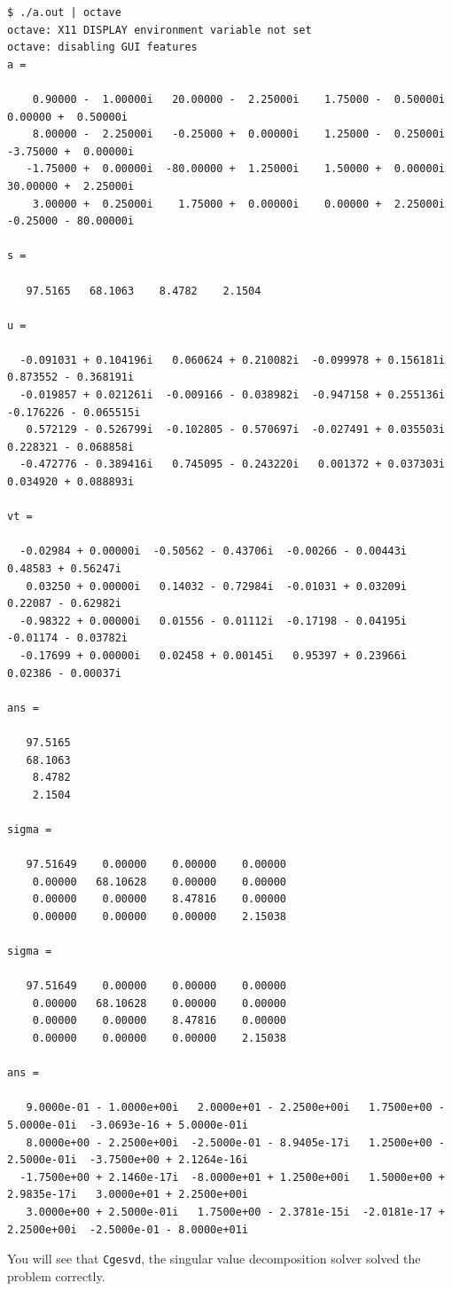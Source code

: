 \documentclass[12pt]{article}
\begin{document}
{\footnotesize
\begin{verbatim}
$ ./a.out | octave
octave: X11 DISPLAY environment variable not set
octave: disabling GUI features
a =

    0.90000 -  1.00000i   20.00000 -  2.25000i    1.75000 -  0.50000i    0.00000 +  0.50000i
    8.00000 -  2.25000i   -0.25000 +  0.00000i    1.25000 -  0.25000i   -3.75000 +  0.00000i
   -1.75000 +  0.00000i  -80.00000 +  1.25000i    1.50000 +  0.00000i   30.00000 +  2.25000i
    3.00000 +  0.25000i    1.75000 +  0.00000i    0.00000 +  2.25000i   -0.25000 - 80.00000i

s =

   97.5165   68.1063    8.4782    2.1504

u =

  -0.091031 + 0.104196i   0.060624 + 0.210082i  -0.099978 + 0.156181i   0.873552 - 0.368191i
  -0.019857 + 0.021261i  -0.009166 - 0.038982i  -0.947158 + 0.255136i  -0.176226 - 0.065515i
   0.572129 - 0.526799i  -0.102805 - 0.570697i  -0.027491 + 0.035503i   0.228321 - 0.068858i
  -0.472776 - 0.389416i   0.745095 - 0.243220i   0.001372 + 0.037303i   0.034920 + 0.088893i

vt =

  -0.02984 + 0.00000i  -0.50562 - 0.43706i  -0.00266 - 0.00443i   0.48583 + 0.56247i
   0.03250 + 0.00000i   0.14032 - 0.72984i  -0.01031 + 0.03209i   0.22087 - 0.62982i
  -0.98322 + 0.00000i   0.01556 - 0.01112i  -0.17198 - 0.04195i  -0.01174 - 0.03782i
  -0.17699 + 0.00000i   0.02458 + 0.00145i   0.95397 + 0.23966i   0.02386 - 0.00037i

ans =

   97.5165
   68.1063
    8.4782
    2.1504

sigma =

   97.51649    0.00000    0.00000    0.00000
    0.00000   68.10628    0.00000    0.00000
    0.00000    0.00000    8.47816    0.00000
    0.00000    0.00000    0.00000    2.15038

sigma =

   97.51649    0.00000    0.00000    0.00000
    0.00000   68.10628    0.00000    0.00000
    0.00000    0.00000    8.47816    0.00000
    0.00000    0.00000    0.00000    2.15038

ans =

   9.0000e-01 - 1.0000e+00i   2.0000e+01 - 2.2500e+00i   1.7500e+00 - 5.0000e-01i  -3.0693e-16 + 5.0000e-01i
   8.0000e+00 - 2.2500e+00i  -2.5000e-01 - 8.9405e-17i   1.2500e+00 - 2.5000e-01i  -3.7500e+00 + 2.1264e-16i
  -1.7500e+00 + 2.1460e-17i  -8.0000e+01 + 1.2500e+00i   1.5000e+00 + 2.9835e-17i   3.0000e+01 + 2.2500e+00i
   3.0000e+00 + 2.5000e-01i   1.7500e+00 - 2.3781e-15i  -2.0181e-17 + 2.2500e+00i  -2.5000e-01 - 8.0000e+01i

\end{verbatim}
}
You will see that {\tt Cgesvd}, the singular value decomposition solver solved the problem correctly.
\end{document}
